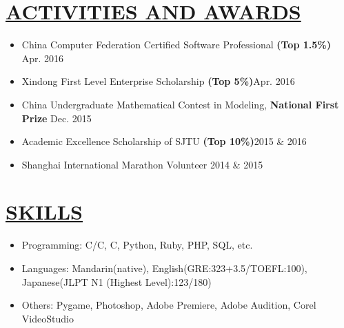 \documentclass{article}
\newcommand{\CC}{C\nolinebreak\hspace{-.05em}\raisebox{.4ex}{\tiny\bf +}\nolinebreak\hspace{-.10em}\raisebox{.4ex}{\tiny\bf +}}
\newcommand{\CS}{C\nolinebreak\hspace{-.05em}\raisebox{.6ex}{\scriptsize\bf \#}}
\begin{document}
\section{\underline{ACTIVITIES AND AWARDS}}
{\begin{itemize}
\item China Computer Federation Certified Software Professional \textbf{(Top 1.5\%)} \hfill Apr. 2016
\item Xindong First Level Enterprise Scholarship \textbf{(Top 5\%)}\hfill Apr. 2016
\item China Undergraduate Mathematical Contest in Modeling, \textbf{National First Prize} \hfill Dec. 2015
\item Academic Excellence Scholarship of SJTU \textbf{(Top 10\%)}\hfill 2015 \& 2016
\item Shanghai International Marathon Volunteer \hfill 2014 \& 2015
\end{itemize}}\vspace{\parsep}

\section{\underline{SKILLS}}
{\begin{itemize}
\item Programming: C/\CC, \CS, Python, Ruby, PHP, SQL, etc.
\item Languages: Mandarin(native), English(GRE:323+3.5/TOEFL:100), Japanese(JLPT N1 (Highest Level):123/180)
\item Others: Pygame, Photoshop, Adobe Premiere, Adobe Audition, Corel VideoStudio
\end{itemize}}
\end{document}
